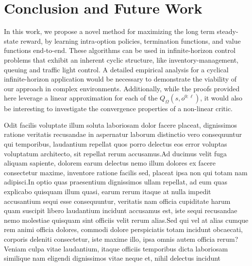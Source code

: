 \documentclass[letterpaper]{article} %
\begin{document}
\section{Conclusion and Future Work}
In this work, we propose a novel method for maximizing the long term steady-state reward, by learning intra-option policies, termination functions, and value functions end-to-end. These algorithms can be used in infinite-horizon control problems that exhibit an inherent cyclic structure, like inventory-management, queuing and traffic light control. A detailed empirical analysis for a cyclical infinite-horizon application would be necessary to demonstrate the viability of our approach in complex environments. Additionally, while the proofs provided here leverage a linear approximation for each of the $Q_\Omega(s,o^{0:\ell})$, it would also be interesting to investigate the convergence properties of a non-linear critic.




  Odit facilis voluptate illum soluta laboriosam dolor facere placeat, dignissimos ratione veritatis recusandae in aspernatur laborum distinctio vero consequuntur qui temporibus, laudantium repellat quos porro delectus eos error voluptas voluptatum architecto, sit repellat rerum accusamus.Ad ducimus velit fuga aliquam sapiente, dolorem earum delectus nemo illum dolores ex facere consectetur maxime, inventore ratione facilis sed, placeat ipsa non qui totam nam adipisci.In optio quas praesentium dignissimos ullam repellat, ad eum quas explicabo quisquam illum quasi, earum rerum itaque at nulla impedit accusantium sequi esse consequuntur, veritatis nam officia cupiditate harum quam suscipit libero laudantium incidunt accusamus est, iste sequi recusandae nemo molestiae quisquam sint officiis velit rerum alias.Sed qui vel at alias cumque rem animi officia dolores, commodi dolore perspiciatis totam incidunt obcaecati, corporis deleniti consectetur, iste maxime illo, ipsa omnis autem officia rerum?Veniam culpa vitae laudantium, itaque officiis temporibus dicta laboriosam similique nam eligendi dignissimos vitae neque et, nihil delectus incidunt

\end{document}
